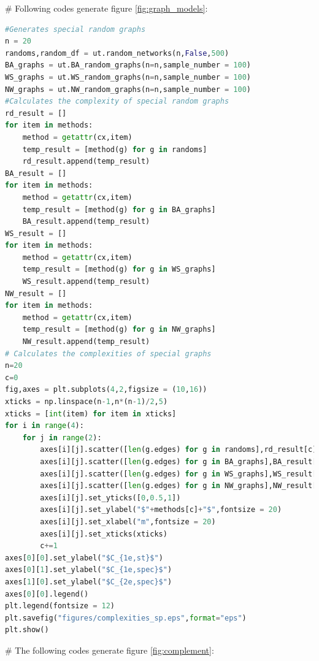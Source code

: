 \documentclass[12pt]{article}
\begin{document}
\noindent
\newline
\# Following codes generate figure \ref{fig:graph_models}:
\begin{lstlisting}[breaklines=true,language=Python]
#Generates special random graphs
n = 20
randoms,random_df = ut.random_networks(n,False,500)
BA_graphs = ut.BA_random_graphs(n=n,sample_number = 100)
WS_graphs = ut.WS_random_graphs(n=n,sample_number = 100)
NW_graphs = ut.NW_random_graphs(n=n,sample_number = 100)
#Calculates the complexity of special random graphs
rd_result = []
for item in methods:
    method = getattr(cx,item)
    temp_result = [method(g) for g in randoms]
    rd_result.append(temp_result)
BA_result = []
for item in methods:
    method = getattr(cx,item)
    temp_result = [method(g) for g in BA_graphs]
    BA_result.append(temp_result)
WS_result = []
for item in methods:
    method = getattr(cx,item)
    temp_result = [method(g) for g in WS_graphs]
    WS_result.append(temp_result)
NW_result = []
for item in methods:
    method = getattr(cx,item)
    temp_result = [method(g) for g in NW_graphs]
    NW_result.append(temp_result)
# Calculates the complexities of special graphs
n=20
c=0
fig,axes = plt.subplots(4,2,figsize = (10,16))
xticks = np.linspace(n-1,n*(n-1)/2,5)
xticks = [int(item) for item in xticks]
for i in range(4):
    for j in range(2):
        axes[i][j].scatter([len(g.edges) for g in randoms],rd_result[c],s=15,color = "black",alpha = 0.7,label = "$G(n,m)$")
        axes[i][j].scatter([len(g.edges) for g in BA_graphs],BA_result[c],s=15,color = "green",label = "BA")
        axes[i][j].scatter([len(g.edges) for g in WS_graphs],WS_result[c],marker = "x",s=15,color = "red",label = "WS")
        axes[i][j].scatter([len(g.edges) for g in NW_graphs],NW_result[c],marker = "s",s=15,color = "blue",label = "NW")
        axes[i][j].set_yticks([0,0.5,1])
        axes[i][j].set_ylabel("$"+methods[c]+"$",fontsize = 20)
        axes[i][j].set_xlabel("m",fontsize = 20)
        axes[i][j].set_xticks(xticks)
        c+=1
axes[0][0].set_ylabel("$C_{1e,st}$")
axes[0][1].set_ylabel("$C_{1e,spec}$")
axes[1][0].set_ylabel("$C_{2e,spec}$")
axes[0][0].legend()
plt.legend(fontsize = 12)
plt.savefig("figures/complexities_sp.eps",format="eps")
plt.show()
\end{lstlisting}
\noindent
\newline
\# The following codes generate figure \ref{fig:complement}:
\end{document}
